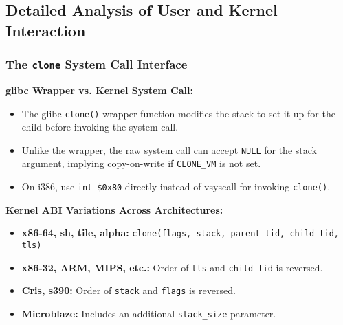 \subsection{Detailed Analysis of User and Kernel Interaction}
\begin{frame}
    \frametitle{The \texttt{clone} System Call Interface}
    \textbf{glibc Wrapper vs. Kernel System Call:}
    \begin{itemize}
        \item The glibc \texttt{clone()} wrapper function modifies the stack to set it up for the child before invoking the system call.
        \item Unlike the wrapper, the raw system call can accept \texttt{NULL} for the stack argument, implying copy-on-write if \texttt{CLONE\_VM} is not set.
        \item On i386, use \texttt{int \$0x80} directly instead of vsyscall for invoking \texttt{clone()}.
    \end{itemize}

    \textbf{Kernel ABI Variations Across Architectures:}
    \begin{itemize}
        \item \textbf{x86-64, sh, tile, alpha:} \texttt{clone(flags, stack, parent\_tid, child\_tid, tls)}
        \item \textbf{x86-32, ARM, MIPS, etc.:} Order of \texttt{tls} and \texttt{child\_tid} is reversed.
        \item \textbf{Cris, s390:} Order of \texttt{stack} and \texttt{flags} is reversed.
        \item \textbf{Microblaze:} Includes an additional \texttt{stack\_size} parameter.
    \end{itemize}
\end{frame}

